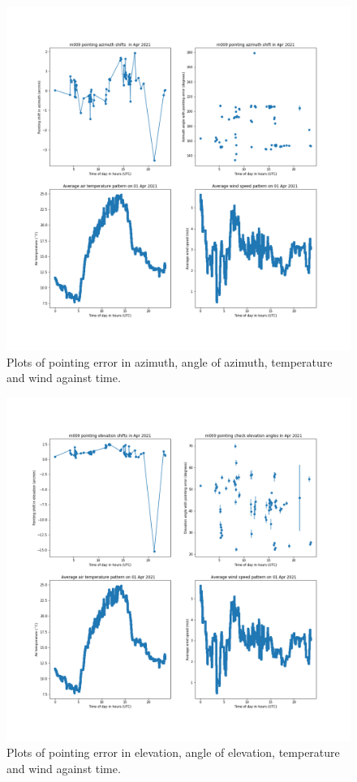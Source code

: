 \documentclass{article}
\begin{document}
\begin{figure}[H]
	\centering
	\includegraphics[scale=0.45]{m009_azim_Mar.png}
	
	\caption{Plots of pointing error in azimuth, angle of azimuth, temperature and wind against time.}
	\label{fig:m009AzimMar}
\end{figure}


\begin{figure}[H]
	\centering
	\includegraphics[scale=0.45]{m009_elev_Apr.png}
	
	\caption{Plots of pointing error in elevation, angle of elevation, temperature and wind against time.}
	\label{fig:m009ElevApr}
\end{figure}
\end{document}
